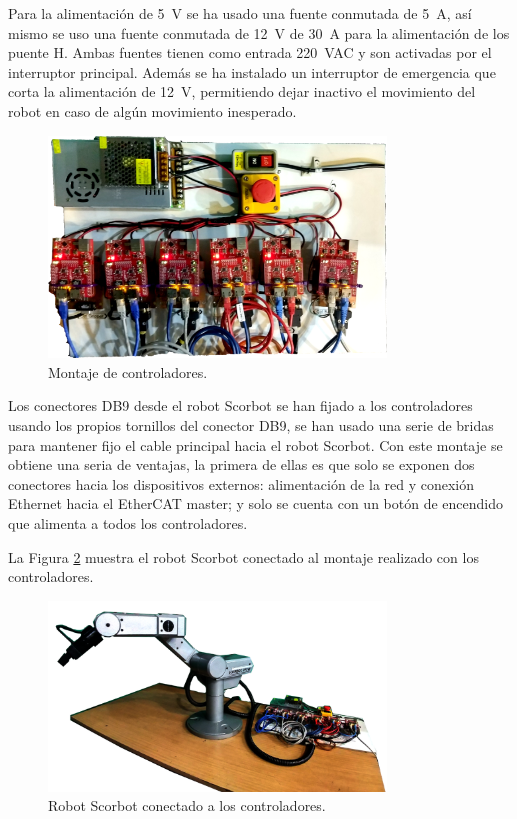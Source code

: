 Para la alimentación de \SI{5}{\volt} se ha usado una fuente conmutada de \SI{5}{\ampere}, así mismo se uso una fuente conmutada de \SI{12}{\volt} de  \SI{30}{\ampere} para la alimentación de los puente H. Ambas fuentes tienen como entrada \SI{220}{VAC} y son activadas por el interruptor principal. Además se ha instalado un interruptor de emergencia que corta la alimentación de \SI{12}{\volt}, permitiendo dejar inactivo el movimiento del robot en caso de algún movimiento inesperado.

\begin{figure}[H]
  \centering
  \includegraphics[width=0.8\textwidth]{img/cap4/montaje}
  \caption{Montaje de controladores.}
  \label{cap4_montaje}
\end{figure}

Los conectores DB9 desde el robot Scorbot se han fijado a los controladores usando los propios tornillos del conector DB9, se han usado una serie de bridas para mantener fijo el cable principal hacia el robot Scorbot. Con este montaje se obtiene una seria de ventajas, la primera de ellas es que solo se exponen dos conectores hacia los dispositivos externos: alimentación de la red y conexión Ethernet hacia el EtherCAT master; y solo se cuenta con un botón de encendido que alimenta a todos los controladores.

La Figura \ref{cap4_completo} muestra el robot Scorbot conectado al montaje realizado con los controladores.

\begin{figure}[H]
  \centering
  \includegraphics[width=0.8\textwidth]{img/cap4/scorbot_completo}
  \caption{Robot Scorbot conectado a los controladores.}
  \label{cap4_completo}
\end{figure}

